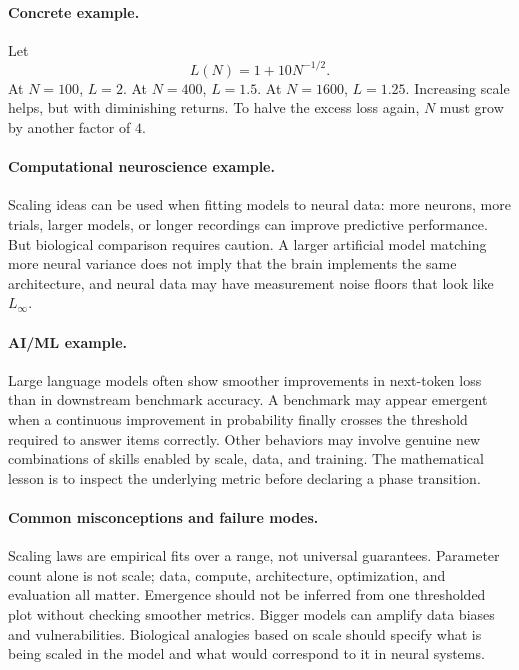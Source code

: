 \paragraph{Concrete example.}
Let
\[
L(N)=1+10N^{-1/2}.
\]
At \(N=100\), \(L=2\). At \(N=400\), \(L=1.5\). At \(N=1600\), \(L=1.25\). Increasing scale helps, but with diminishing returns. To halve the excess loss again, \(N\) must grow by another factor of \(4\).

\paragraph{Computational neuroscience example.}
Scaling ideas can be used when fitting models to neural data: more neurons, more trials, larger models, or longer recordings can improve predictive performance. But biological comparison requires caution. A larger artificial model matching more neural variance does not imply that the brain implements the same architecture, and neural data may have measurement noise floors that look like \(L_\infty\).

\paragraph{AI/ML example.}
Large language models often show smoother improvements in next-token loss than in downstream benchmark accuracy. A benchmark may appear emergent when a continuous improvement in probability finally crosses the threshold required to answer items correctly. Other behaviors may involve genuine new combinations of skills enabled by scale, data, and training. The mathematical lesson is to inspect the underlying metric before declaring a phase transition.

\paragraph{Common misconceptions and failure modes.}
Scaling laws are empirical fits over a range, not universal guarantees. Parameter count alone is not scale; data, compute, architecture, optimization, and evaluation all matter. Emergence should not be inferred from one thresholded plot without checking smoother metrics. Bigger models can amplify data biases and vulnerabilities. Biological analogies based on scale should specify what is being scaled in the model and what would correspond to it in neural systems.


